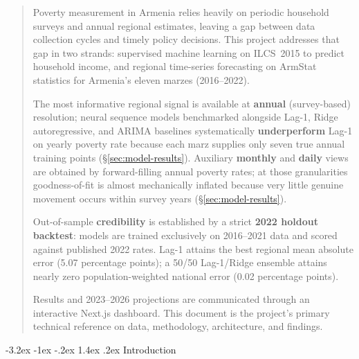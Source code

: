 \documentclass[12pt]{article}
\makeatletter
\newcommand{\fancytableofcontents}{%
  \if@twocolumn\@restonecoltrue\onecolumn\else\@restonecolfalse\fi
  \par\vspace*{0pt}%
  \noindent{\color{navyblue}\large\bfseries Contents}\par\vspace{0.3ex}%
  \noindent{\color{rulecolor}\rule{\linewidth}{0.5pt}}\par\vspace{0.85em}%
  \@mkboth{\MakeUppercase\contentsname}{\MakeUppercase\contentsname}%
  \@starttoc{toc}%
  \if@restonecol\twocolumn\fi
}%
\renewcommand\section{%
  \@startsection{section}{1}{\z@}%
    {-3.2ex \@plus -1ex \@minus -.2ex}%
    {1.4ex \@plus .2ex}%
    {\color{navyblue}\large\bfseries}}
\let\oldsection\section
\renewcommand{\section}[1]{%
  \oldsection{#1}%
  \noindent{\color{rulecolor}\rule{\linewidth}{0.5pt}}\par\vspace{0.3ex}%
}
\makeatother
\begin{document}
\clearpage

\begin{abstract}
\noindent
Poverty measurement in Armenia relies heavily on periodic household surveys and
annual regional estimates, leaving a gap between data collection cycles and timely
policy decisions. This project addresses that gap in two strands: supervised
machine learning on ILCS~2015 to predict household income, and regional
time-series forecasting on ArmStat statistics for Armenia's eleven marzes
(2016--2022).

The most informative regional signal is available at \textbf{annual}
(survey-based) resolution; neural sequence models benchmarked alongside
Lag-1, Ridge autoregressive, and ARIMA baselines systematically \textbf{underperform}
Lag-1 on yearly poverty rate because each marz supplies only seven true annual
training points (\S\ref{sec:model-results}). Auxiliary \textbf{monthly} and
\textbf{daily} views are obtained by forward-filling annual poverty rates; at
those granularities goodness-of-fit is almost mechanically inflated because very
little genuine movement occurs within survey years (\S\ref{sec:model-results}).

Out-of-sample \textbf{credibility} is established by a strict \textbf{2022 holdout backtest}: models are trained exclusively on 2016--2021 data and scored against published 2022 rates. Lag-1 attains the best regional mean absolute error (5.07 percentage points); a 50/50 Lag-1/Ridge ensemble attains nearly zero population-weighted national error (0.02 percentage points).

Results and 2023--2026 projections are communicated through an interactive Next.js
dashboard. This document is the project's primary technical reference on data,
methodology, architecture, and findings.
\end{abstract}

\newpage

\setlength{\parskip}{0pt}

\fancytableofcontents
\newpage

\section{Introduction}
\end{document}
